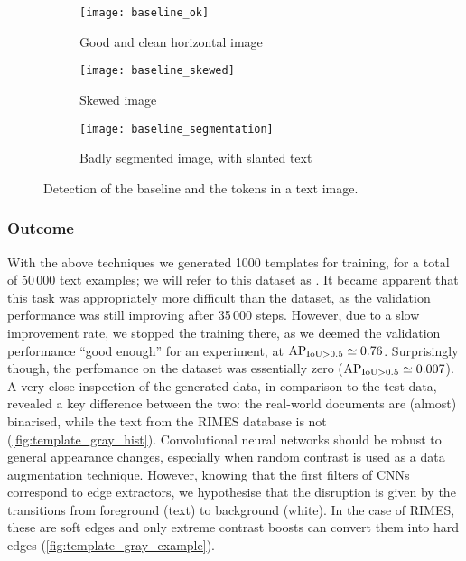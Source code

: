 			\begin{figure}
				\begin{subfigure}{\linewidth}
					\texttt{[image: baseline\_ok]}
					\caption{Good and clean horizontal image}
					\label{fig:baseline_ok}
				\end{subfigure}
				\bigskip

				\begin{subfigure}{\linewidth}
					\texttt{[image: baseline\_skewed]}
					\caption{Skewed image}
					\label{fig:baseline_skewed}
				\end{subfigure}
				\bigskip

				\begin{subfigure}{\linewidth}
					\texttt{[image: baseline\_segmentation]}
					\caption{Badly segmented image, with slanted text}
					\label{fig:baseline_segmentation}
				\end{subfigure}
				\caption[Baseline and tokens]{Detection of the baseline and the tokens in a text image.}
				\label{fig:baseline}
			\end{figure}


		\subsubsection*{Outcome}
			With the above techniques we generated 1000 templates for training, for a total of 50\,000 text examples; we will refer to this dataset as . It became apparent that this task was appropriately more difficult than the  dataset, as the validation performance was still improving after 35\,000 steps. However, due to a slow improvement rate, we stopped the training there, as we deemed the validation performance ``good enough'' for an experiment, at \(\operatorname{\operatorname{AP}_{\operatorname{IoU} > 0.5}} \simeq 0.76\). Surprisingly though, the perfomance on the  dataset was essentially zero (\(\operatorname{\operatorname{AP}_{\operatorname{IoU} > 0.5}} \simeq 0.007\)). A very close inspection of the generated data, in comparison to the test data, revealed a key difference between the two: the real-world documents are (almost) binarised, while the text from the RIMES database is not (\autoref{fig:template_gray_hist}). Convolutional neural networks should be robust to general appearance changes, especially when random contrast is used as a data augmentation technique. However, knowing that the first filters of CNNs correspond to edge extractors, we hypothesise that the disruption is given by the transitions from foreground (text) to background (white). In the case of RIMES, these are soft edges and only extreme contrast boosts can convert them into hard edges (\autoref{fig:template_gray_example}).

